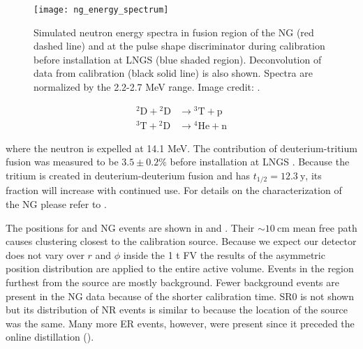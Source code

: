\begin{figure}
\centering
\texttt{[image: ng\_energy\_spectrum]}
\caption{Simulated neutron energy spectra in fusion region of the NG (red dashed line) and at the pulse shape discriminator during
calibration before installation at LNGS (blue shaded region).  Deconvolution of data from calibration (black solid line) is also
shown.  Spectra are normalized by the 2.2-2.7 MeV range.  Image credit: .}
\label{fig:er_nr_calibrations_parameter_determ_nr_ng_energy}
\end{figure}

\vspace{-25pt}

\begin{subequations}
\begin{align}
\mathrm{^{2}D} + \mathrm{^{2}D} &\rightarrow \mathrm{^{3}T} + \mathrm{p} \\
\mathrm{^{3}T} + \mathrm{^{2}D} &\rightarrow \mathrm{^{4}He} + \mathrm{n}
\end{align}
\end{subequations}

\vspace{-10pt}

\noindent where the neutron is expelled at 14.1 MeV.  The contribution of deuterium-tritium fusion was measured to be $3.5 \pm 0.2\%$
before installation at LNGS .  Because the tritium is created in deuterium-deuterium fusion and has
$t_{1/2} = 12.3\ \mathrm{y}$, its fraction will increase with continued use.  For details on the characterization of the NG
please refer to .

The positions for \ambe and NG events are shown in  and
.  Their ${\sim}10\ \mathrm{cm}$ mean free path causes clustering
closest to the calibration source.  Because we expect our
detector does not vary over $r$ and $\phi$ inside the 1 t FV the results of the asymmetric position distribution are applied to the entire
active volume.  Events in the region furthest from the source are mostly background.  Fewer background events are present in the NG data
because of the shorter calibration time.  SR0 \ambe is not shown but its distribution of NR events is similar to
 because the location of the source was the same.  Many more ER events,
however, were present since it preceded the online distillation ().

